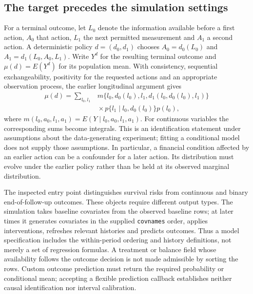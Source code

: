 \subsection{The target precedes the simulation settings}
\label{exec20:gformula-target}
For a terminal outcome, let $L_0$ denote the information available before a first action, $A_0$ that action, $L_1$ the next permitted measurement and $A_1$ a second action. A deterministic policy $d=(d_0,d_1)$ chooses $A_0=d_0(L_0)$ and $A_1=d_1(L_0,A_0,L_1)$. Write $Y^d$ for the resulting terminal outcome and $\mu(d)=E(Y^d)$ for its population mean. With consistency, sequential exchangeability, positivity for the requested actions and an appropriate observation process, the earlier longitudinal argument gives
\begin{equation}
\begin{split}
 \mu(d)=\sum_{l_0,l_1}&m\{l_0,d_0(l_0),l_1,
                  d_1(l_0,d_0(l_0),l_1)\}\\
 &{}\times p\{l_1\mid l_0,d_0(l_0)\}p(l_0),
\end{split}
\label{exec20:gformula-law}
\end{equation}
where $m(l_0,a_0,l_1,a_1)=E(Y\mid l_0,a_0,l_1,a_1)$. For continuous variables the corresponding sums become integrals. This is an identification statement under assumptions about the data-generating experiment; fitting a conditional model does not supply those assumptions. In particular, a financial condition affected by an earlier action can be a confounder for a later action. Its distribution must evolve under the earlier policy rather than be held at its observed marginal distribution.~\citep{hernan2020}

The inspected entry point distinguishes survival risks from continuous and binary end-of-follow-up outcomes. These objects require different output types. The simulation takes baseline covariates from the observed baseline rows; at later times it generates covariates in the supplied \texttt{covnames} order, applies interventions, refreshes relevant histories and predicts outcomes. Thus a model specification includes the within-period ordering and history definitions, not merely a set of regression formulas. A treatment or balance field whose availability follows the outcome decision is not made admissible by sorting the rows. Custom outcome prediction must return the required probability or conditional mean; accepting a flexible prediction callback establishes neither causal identification nor interval calibration.~\citep{exec20_gformula_reuse}

